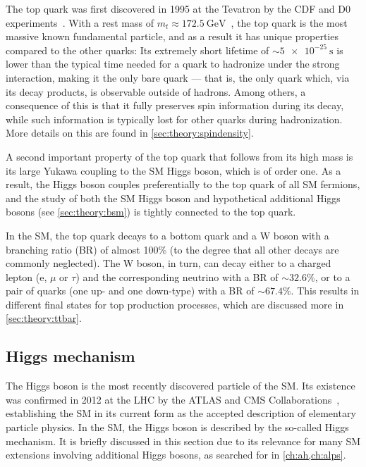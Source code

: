 The top quark was first discovered in 1995 at the Tevatron by the CDF and D0 experiments~\cite{CDF:1995wbb,D0:1995jca}. With a rest mass of $m_t \approx \SI{172.5}{\GeV}$~\cite{ATLASCMS:2024dxp}, the top quark is the most massive known fundamental particle, and as a result it has unique properties compared to the other quarks: Its extremely short lifetime of $\sim \SI{5e-25}{\s}$ is lower than the typical time needed for a quark to hadronize under the strong interaction, making it the only bare quark --- that is, the only quark which,  via its decay products, is observable outside of hadrons. Among others, a consequence of this is that it fully preserves spin information during its decay, while such information is typically lost for other quarks during hadronization. More details on this are found in \cref{sec:theory:spindensity}.

A second important property of the top quark that follows from its high mass is its large Yukawa coupling to the SM Higgs boson, which is of order one. As a result, the Higgs boson couples preferentially to the top quark of all SM fermions, and the study of both the SM Higgs boson and hypothetical additional Higgs bosons (see \cref{sec:theory:bsm}) is tightly connected to the top quark. 

In the SM, the top quark decays to a bottom quark and a W boson with a branching ratio (BR) of almost 100\% (to the degree that all other decays are commonly neglected). The W boson, in turn, can decay either to a charged lepton (e, $\mu$ or $\tau$) and the corresponding neutrino with a BR of $\sim32.6\%$, or to a pair of quarks (one up- and one down-type) with a BR of $\sim67.4\%$. This results in different final states for top production processes, which are discussed more in \cref{sec:theory:ttbar}.

\subsection{Higgs mechanism}
\label{sec:theory:higgs}

The Higgs boson is the most recently discovered particle of the SM. Its existence was confirmed in 2012 at the LHC by the ATLAS and CMS Collaborations~\cite{ATLAS:2012tfa,CMS:HIG-12-028,CMS:HIG-12-036}, establishing the SM in its current form as the accepted description of elementary particle physics. In the SM, the Higgs boson is described by the so-called Higgs mechanism. It is briefly discussed in this section due to its relevance for many SM extensions involving additional Higgs bosons, as searched for in \cref{ch:ah,ch:alps}.

